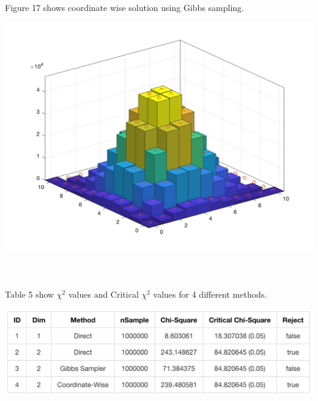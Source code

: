 Figure 17 shows coordinate wise solution using Gibbs sampling.

\begin{center}
    \includegraphics[scale=0.5]{Figures/figure6_5.png}\\
\end{center}\\
\\
Table 5 show $\chi^2$ values and Critical $ \chi^2$ values for 4 different methods.\\
\begin{center}
    \includegraphics[scale=0.5]{Figures/figure6_6.png}\\
\end{center}\\